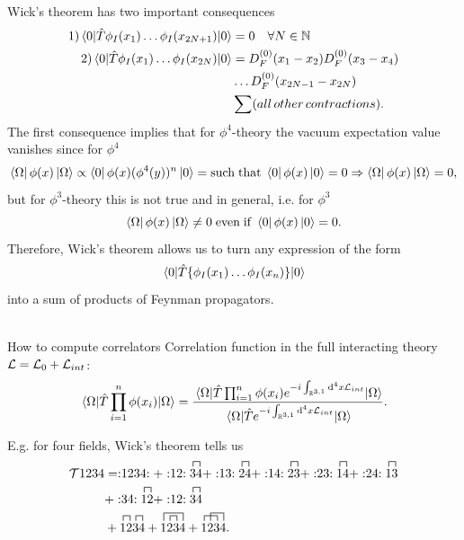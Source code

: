 Wick's theorem has two important consequences
\begin{align}
	\label{eq:wickodd}
	1) \expval{\hat{T} \phi_I(x_1) \dots \phi_I(x_{2N+1})}{0} &= 0 \quad \forall N\in \mathbb{N} \\
	2) \expval{\hat{T}\phi_I(x_1) \dots \phi_I(x_{2N})}{0} &=D^{(0)}_F(x_1-x_2) D^{(0)}_F(x_3-x_4) \\\nonumber
	&\dots D^{(0)}_F(x_{2N-1}-x_{2N}) \\ \nonumber
	& \sum (all \,other\, contractions).\nonumber
\end{align}
The first consequence implies that for $\phi^4$-theory the vacuum expectation value vanishes since for $\phi^4$
\begin{equation}
	\bra{\Omega}\phi(x)\ket{\Omega} \propto \bra{0}\phi(x) (\phi^4(y))^n\ket{0} = \mathrm{such\;that} \; \bra{0}\phi(x) \ket{0} = 0 \Rightarrow \bra{\Omega}\phi(x) \ket{\Omega}=0,
\end{equation}
but for $\phi^3$-theory this is not true and in general, i.e. for $\phi^3$
\begin{equation}
	\bra{\Omega}\phi(x) \ket{\Omega}\neq 0\; \mathrm{even\;if}\; \bra{0}\phi(x)\ket{0}=0.
\end{equation}
Therefore, Wick's theorem allows us to turn any expression of the form  
\begin{equation}
	\expval{\hat{T}\{\phi_I(x_1) \dots \phi_I(x_n)\}}{0}
\end{equation}
into a sum of products of Feynman propagators.\\
\\
\begin{mybox}{How to compute correlators}
	Correlation function in the full interacting theory $\mathcal{L} = \mathcal{L}_0 + \mathcal{L}_{int}$:
	\begin{equation}
		\expval{\hat{T}\prod_{i=1}^{n} \phi(x_i)}{\Omega} = \frac{\expval{\hat{T} \prod_{i=1}^{n} \phi(x_i) e^{-i \int_{\mathbb{R}^{3,1}} \mathrm{d}^4 x \mathcal{L}_{int}}}{\Omega}}{\expval{\hat{T}e^{-i \int_{\mathbb{R}^{3,1}} \mathrm{d}^4 x \mathcal{L}_{int}}}{\Omega}}.
	\end{equation}
\end{mybox}
E.g. for four fields, Wick's theorem tells us
\begin{align*}
	\mathcal{T}1234 &= \normord{1234}+\normord{12} \contraction{}{3}{}{4} 34+ \normord{13}\contraction{}{2}{}{4}24 + \normord{14} \contraction{}{2}{}{3}23+\normord{23}\contraction{}{1}{}{4} 14+\normord{24}\contraction{}{1}{}{3}{}13\\
	&+\normord{34}\contraction{}{1}{}{2}12+\normord{12}\contraction{}{3}{}{4}34\\
	&+\contraction{}{1}{}{2}\contraction{12}{3}{}{4}1234 + \contraction[1.5ex]{}{1}{23}{4}\contraction{1}{2}{}{3}1234 +\contraction{}{1}{2}{3} \contraction[1.5ex]{1}{2}{3}{4}1234.
\end{align*}













